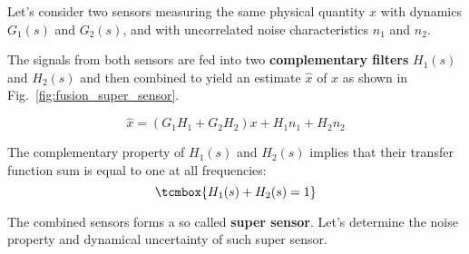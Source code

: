 Let's consider two sensors measuring the same physical quantity \(x\) with
dynamics \(G_1(s)\) and \(G_2(s)\), and with uncorrelated noise characteristics
\(n_1\) and \(n_2\).\newline

The signals from both sensors are fed into two \textbf{complementary filters} \(H_1(s)\)
and \(H_2(s)\) and then combined to yield an estimate \(\hat{x}\) of \(x\) as
shown in Fig.~\ref{fig:fusion_super_sensor}.

\begin{equation*}
  \hat{x} = \left(G_1 H_1 + G_2 H_2\right) x + H_1 n_1 + H_2 n_2
\end{equation*}

The complementary property of \(H_1(s)\) and \(H_2(s)\) implies that their transfer function sum is equal to one at all frequencies:
\begin{equation*}
  \tcmbox{H_1(s) + H_2(s) = 1}
\end{equation*}

The combined sensors forms a so called \textbf{super sensor}.
Let's determine the noise property and dynamical uncertainty of such super
sensor.

